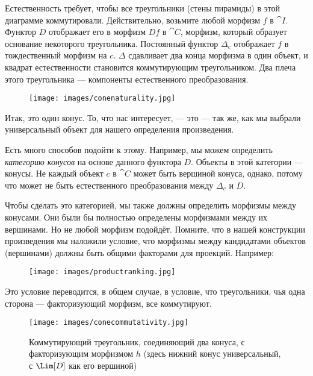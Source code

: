 \noindent
Естественность требует, чтобы все треугольники (стены пирамиды) в
этой диаграмме коммутировали. Действительно, возьмите любой морфизм $f$ в $\cat{I}$.
Функтор $D$ отображает его в морфизм $D f$ в $\cat{C}$,
морфизм, который образует основание некоторого треугольника. Постоянный функтор
$\Delta_c$ отображает $f$ в тождественный морфизм на
$c$. $\Delta$ сдавливает два конца морфизма в один объект, и
квадрат естественности становится коммутирующим треугольником. Два плеча этого
треугольника --- компоненты естественного преобразования.

\begin{figure}[H]
  \centering
  \texttt{[image: images/conenaturality.jpg]}
\end{figure}

\noindent
Итак, это один конус. То, что нас интересует, --- это  --- так же, как мы выбрали универсальный объект для нашего определения
произведения.

Есть много способов подойти к этому. Например, мы можем определить
\emph{категорию конусов} на основе данного функтора $D$. Объекты в этой
категории --- конусы. Не каждый объект $c$ в $\cat{C}$ может быть
вершиной конуса, однако, потому что может не быть естественного преобразования
между $\Delta_c$ и $D$.

Чтобы сделать это категорией, мы также должны определить морфизмы между конусами.
Они были бы полностью определены морфизмами между их вершинами. Но
не любой морфизм подойдёт. Помните, что в нашей конструкции
произведения мы наложили условие, что морфизмы между кандидатами
объектов (вершинами) должны быть общими факторами для проекций. Например:


\begin{figure}[H]
  \centering
  \texttt{[image: images/productranking.jpg]}
\end{figure}

Это условие переводится, в общем случае, в условие, что
треугольники, чья одна сторона --- факторизующий морфизм, все коммутируют.

\begin{figure}[H]
  \centering
  \texttt{[image: images/conecommutativity.jpg]}
  \caption{Коммутирующий треугольник, соединяющий два конуса, с факторизующим
    морфизмом $h$ (здесь нижний конус универсальный, с
    $\Lim[D]$ как его вершиной)}
\end{figure}

